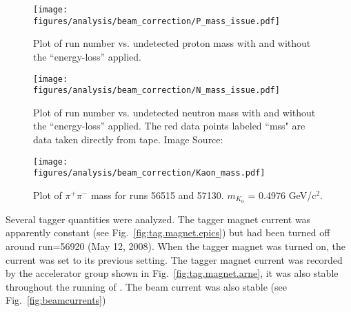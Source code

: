 \begin{figure}[h!]\begin{center}
\texttt{[image: \\figures/analysis/beam\_correction/P\_mass\_issue.pdf]}
\caption[Plot of  run number vs. undetected proton mass with and without the ``energy-loss'' applied]{\label{fig:beamcor.p_mass}Plot of  run number vs. undetected proton mass with and without the ``energy-loss'' applied. }
\end{center}\end{figure}

\begin{figure}[h!]\begin{center}
\texttt{[image: \\figures/analysis/beam\_correction/N\_mass\_issue.pdf]}
\caption[Plot of  run number vs. undetected neutron mass with and without the ``energy-loss'' applied]{\label{fig:beamcor.n_mass}Plot of  run number vs. undetected neutron mass with and without the ``energy-loss'' applied. The red data points labeled ``mss" are data taken directly from tape. Image Source:~\cite{bookwalter}}
  \end{center}\end{figure}
  
  \begin{figure}[h!]\begin{center}
  \texttt{[image: \\figures/analysis/beam\_correction/Kaon\_mass.pdf]}
  \caption[Plot of $\pi^+ \pi^-$ mass for runs 56515 and 57130]{\label{fig:beamcor.k_mass}Plot of $\pi^+ \pi^-$ mass for runs 56515 and 57130. $m_{K_0}$ = 0.4976 GeV/c$^2$.}
  \end{center}\end{figure}
  \FloatBarrier
  Several tagger quantities were analyzed. The tagger magnet current was apparently constant (see Fig.~\ref{fig:tag.magnet.epics}) but had been turned off around run=56920 (May 12, 2008). When the tagger magnet was turned on, the current was set to its previous setting. The tagger magnet current was recorded by the accelerator group shown in Fig.~\ref{fig:tag.magnet.arne}, it was also stable throughout the running of . The beam current was also stable (see Fig.~\ref{fig:beamcurrents})
  
